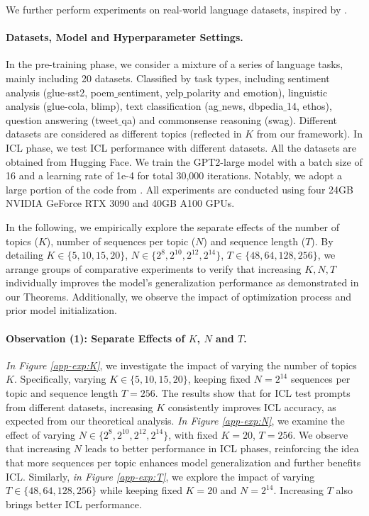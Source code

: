 We further perform experiments on real-world language datasets, inspired by \citep{min2021metaicl,wang2023large}. 

\paragraph{Datasets, Model and Hyperparameter Settings.} In the pre-training phase, we consider a mixture of a series of language tasks, mainly including 20 datasets. Classified by task types, including sentiment analysis (glue-sst2, poem$\_$sentiment, yelp$\_$polarity and emotion), linguistic analysis (glue-cola, blimp), text classification (ag$\_$news, dbpedia$\_$14, ethos), question answering (tweet$\_$qa) and commonsense reasoning (swag). Different datasets are considered as different topics (reflected in $K$ from our framework). In ICL phase, we test ICL performance with different datasets. All the datasets are obtained from Hugging Face. We train the GPT2-large model with a batch size of 16 and a learning rate of 1e-4 for total 30,000 iterations. Notably, we adopt a large portion of the code from \cite{wang2023large}. All experiments are conducted using four 24GB NVIDIA GeForce RTX 3090 and 40GB A100 GPUs.

In the following, we empirically explore the separate effects of the number of topics ($K$), number of sequences per topic ($N$) and sequence length ($T$). By detailing $K \in \{5,10,15,20\}$, $N \in \{2^{8}, 2^{10}, 2^{12}, 2^{14}\}$, $T \in \{48, 64, 128, 256\}$, we arrange groups of comparative experiments to verify that increasing $K, N, T$ individually improves the model's generalization performance as demonstrated in our Theorems. Additionally, we observe the impact of optimization process and prior model initialization.

\paragraph{Observation (1): Separate Effects of $K$, $N$ and $T$.} \textit{In Figure \ref{app-exp:K}}, we investigate the impact of varying the number of topics $K$. Specifically, varying $K \in \{5,10,15,20\}$, keeping fixed $N=2^{14}$ sequences per topic and sequence length $T=256$. The results show that for ICL test prompts from different datasets, increasing $K$ consistently improves ICL accuracy, as expected from our theoretical analysis. \textit{In Figure \ref{app-exp:N}}, we examine the effect of varying $N \in \{2^{8},2^{10},2^{12},2^{14}\}$, with fixed $K=20$, $T=256$. We observe that increasing $N$ leads to better performance in ICL phases, reinforcing the idea that more sequences per topic enhances model generalization and further benefits ICL. Similarly, \textit{in Figure \ref{app-exp:T}}, we explore the impact of varying $T \in \{48,64,128,256\}$ while keeping fixed $K=20$ and $N=2^{14}$. Increasing $T$ also brings better ICL performance.

